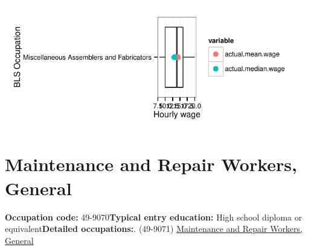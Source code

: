 \documentclass[a4paper,10pt]{article}\usepackage[]{graphicx}\usepackage[]{color}
\makeatletter
\def\maxwidth{ %
  \ifdim\Gin@nat@width>\linewidth
    \linewidth
  \else
    \Gin@nat@width
  \fi
}
\makeatother
\begin{document}
{\centering \includegraphics[width=\maxwidth]{figure/unnamed-chunk-223} 

}


\newpage\section{Maintenance and Repair Workers, General}\textbf{Occupation code:} 49-9070\newline\textbf{Typical entry education:} High school diploma or equivalent\newline\textbf{Detailed occupations:}. (49-9071)  \href{http://www.bls.gov/oes/current/oes499071.htm}{Maintenance and Repair Workers, General}\newline%
\end{document}
